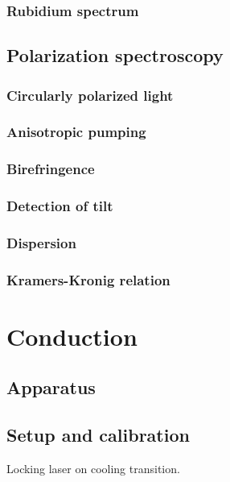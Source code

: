 \documentclass[11pt, english, fleqn, DIV=15, headinclude, BCOR=2cm]{scrreprt}
\begin{document}
\subsection{Rubidium spectrum}

\section{Polarization spectroscopy}

\subsection{Circularly polarized light}

\subsection{Anisotropic pumping}

\subsection{Birefringence}

\subsection{Detection of tilt}

\subsection{Dispersion}

\subsection{Kramers-Kronig relation}

\chapter{Conduction}

\section{Apparatus}

\section{Setup and calibration}

Locking laser on cooling transition.
\end{document}
